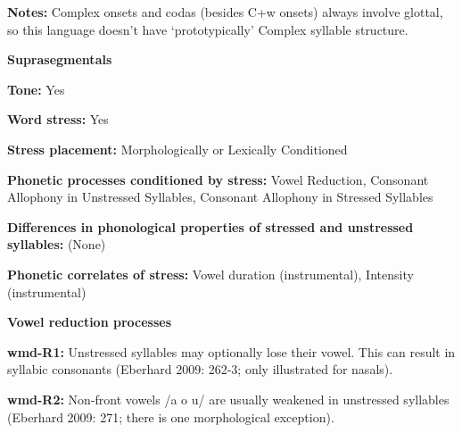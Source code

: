 \begin{styleBody}
\textbf{Notes:} Complex onsets and codas (besides C+w onsets) always involve glottal, so this language doesn’t have ‘prototypically’ Complex syllable structure.
\end{styleBody}

\begin{styleBody}
\textbf{Suprasegmentals}
\end{styleBody}

\begin{styleBody}
\textbf{Tone:} Yes
\end{styleBody}

\begin{styleBody}
\textbf{Word stress:} Yes
\end{styleBody}

\begin{styleBody}
\textbf{Stress placement:} Morphologically or Lexically Conditioned
\end{styleBody}

\begin{styleBody}
\textbf{Phonetic processes conditioned by stress:} Vowel Reduction, Consonant Allophony in Unstressed Syllables, Consonant Allophony in Stressed Syllables
\end{styleBody}

\begin{styleBody}
\textbf{Differences in phonological properties of stressed and unstressed syllables:} (None)
\end{styleBody}

\begin{styleBody}
\textbf{Phonetic correlates of stress: }Vowel duration (instrumental), Intensity (instrumental)
\end{styleBody}

\begin{styleBody}
\textbf{Vowel reduction processes}
\end{styleBody}

\begin{styleBody}
\textbf{wmd-R1:} Unstressed syllables may optionally lose their vowel. This can result in syllabic consonants (Eberhard 2009: 262-3; only illustrated for nasals).
\end{styleBody}

\begin{styleBody}
\textbf{wmd-R2: }Non-front vowels /a o u/ are usually weakened in unstressed syllables (Eberhard 2009: 271; there is one morphological exception).
\end{styleBody}


